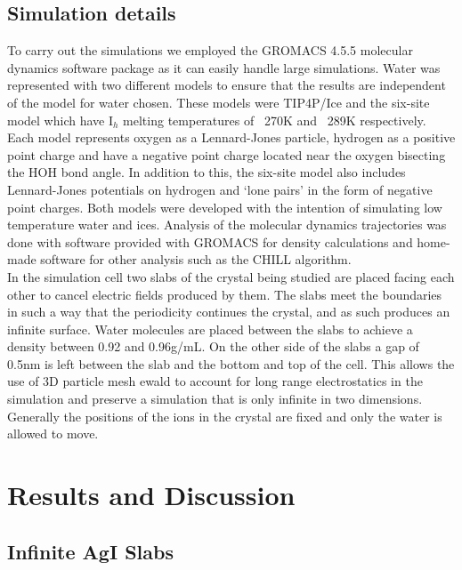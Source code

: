 \documentclass[titlepage]{article}
\begin{document}
\subsection{Simulation details}
	To carry out the simulations we employed the GROMACS 4.5.5 molecular dynamics software package\cite{P13} as it can easily handle large simulations.  Water was represented with two different models to ensure that the results are independent of the model for water chosen.  These models were TIP4P/Ice\cite{ASFV05} and the six-site model\cite{NE03} which have I$_{h}$ melting temperatures of ~270K and ~289K\cite{AFVC06, ASFV05} respectively.  Each model represents oxygen as a Lennard-Jones particle, hydrogen as a positive point charge and have a negative point charge located near the oxygen bisecting the HOH bond angle.  In addition to this, the six-site model also includes Lennard-Jones potentials on hydrogen and `lone pairs' in the form of negative point charges.  Both models were developed with the intention of simulating low temperature water and ices.   Analysis of the molecular dynamics trajectories was done with software provided with GROMACS for density calculations and home-made software for other analysis such as the CHILL algorithm. \\
\indent In the simulation cell two slabs of the crystal being studied are placed facing each other to cancel electric fields produced by them.  The slabs meet the boundaries in such a way that the periodicity continues the crystal, and as such produces an infinite surface.  Water molecules are placed between the slabs to achieve a density between 0.92 and 0.96g/mL.  On the other side of the slabs a gap of 0.5nm is left between the slab and the bottom and top of the cell.  This allows the use of 3D particle mesh ewald to account for long range electrostatics in the simulation and preserve a simulation that is only infinite in two dimensions.  Generally the positions of the ions in the crystal are fixed and only the water is allowed to move.
\section{Results and Discussion}
\subsection{Infinite AgI Slabs}
\end{document}
